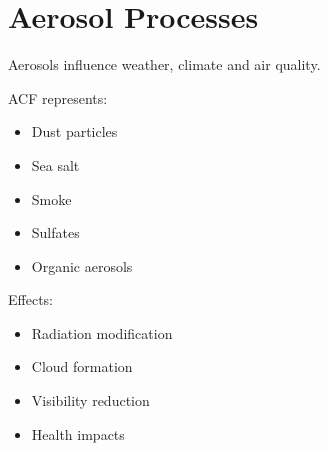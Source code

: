 \section{Aerosol Processes}


Aerosols influence weather, climate and air quality.



ACF represents:


\begin{itemize}

\item Dust particles

\item Sea salt

\item Smoke

\item Sulfates

\item Organic aerosols

\end{itemize}



Effects:


\begin{itemize}

\item Radiation modification

\item Cloud formation

\item Visibility reduction

\item Health impacts

\end{itemize}
